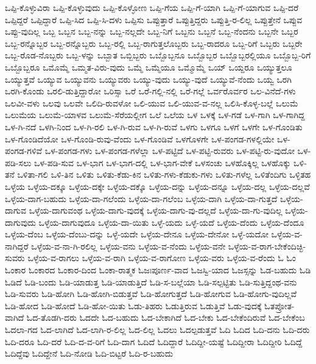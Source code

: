 {ಒಪ್ಪಿ-ಕೊಳ್ಳುವಿರಾ
ಒಪ್ಪಿ-ಕೊಳ್ಳುವುದು
ಒಪ್ಪಿ-ಕೊಳ್ಳೋಣ
ಒಪ್ಪಿ-ಗೆಯ
ಒಪ್ಪಿ-ಗೆ-ಯಾಗಿ
ಒಪ್ಪಿ-ಗೆ-ಯಾಗುವ
ಒಪ್ಪಿ-ದರೆ
ಒಪ್ಪಿದ್ದರೆ
ಒಪ್ಪಿದ್ದಾರೆ
ಒಪ್ಪಿ-ಸಿದ
ಒಪ್ಪಿ-ಸಿ-ದಳು
ಒಪ್ಪಿಸು
ಒಪ್ಪುತ್ತಾರೆ
ಒಪ್ಪುತ್ತಿದ್ದರು
ಒಪ್ಪುತ್ತಿ-ರ-ಲಿಲ್ಲ
ಒಪ್ಪುತ್ತೇನೆ
ಒಪ್ಪುವ
ಒಪ್ಪು-ವುದಿಲ್ಲ
ಒಬ್ಬ
ಒಬ್ಬನ
ಒಬ್ಬ-ನನ್ನು
ಒಬ್ಬ-ನಲ್ಲದೇ
ಒಬ್ಬ-ನಿಗೆ
ಒಬ್ಬನು
ಒಬ್ಬನೆ
ಒಬ್ಬ-ನೆಂದನು
ಒಬ್ಬನೇ
ಒಬ್ಬರ
ಒಬ್ಬ-ರನ್ನೊಬ್ಬರ
ಒಬ್ಬ-ರನ್ನೊಬ್ಬರು
ಒಬ್ಬ-ರಲ್ಲಿ
ಒಬ್ಬ-ರಾಗುತ್ತಲೊಬ್ಬರು
ಒಬ್ಬ-ರಾದರೂ
ಒಬ್ಬ-ರಿಗೆ
ಒಬ್ಬರು
ಒಬ್ಬರೇ
ಒಬ್ಬ-ರೊಡ-ನೊಬ್ಬರು
ಒಬ್ಬ-ಳನ್ನು
ಒಬ್ಬಾತ
ಒಬ್ಬಿಬ್ಬರು
ಒಬ್ಬೊಬ್ಬನೂ
ಒಬ್ಬೊಬ್ಬರ
ಒಬ್ಬೊಬ್ಬರಲ್ಲಿಯೂ
ಒಬ್ಬೊಬ್ಬ-ರಿಗೆ
ಒಬ್ಬೊಬ್ಬರೂ
ಒಮೊಮ್ಮೆ
ಒಮ್ಮತ-ವಿರು-ವುದು
ಒಮ್ಮೆ
ಒಮ್ಮೆಯೂ
ಒಮ್ಮೊಮ್ಮೆ
ಒಯ್
ಒಯ್ದರೂ
ಒಯ್ಯುತ್ತಲೂ
ಒಯ್ಯುತ್ತವೆ
ಒಯ್ಯುವ
ಒಯ್ಯುವನು
ಒಯ್ಯುವರು
ಒಯ್ಯು-ವುದು
ಒಯ್ಯು-ವುದೆ
ಒಯ್ಯುವೆ-ನೆಂದು
ಒಯ್ವ
ಒರಗಿ
ಒರಗಿ-ಕೊಂಡು
ಒರಲಿ-ಡುತ್ತಿದ್ದಾರೋ
ಒರಿಸ್ಸಾ
ಒರೆ
ಒರೆ-ಗಲ್ಲಿ-ನಲ್ಲಿ
ಒರೆ-ಗಲ್ಲೆ
ಒರ್ವರೊರ್ವರ
ಒಲ-ವಿನೆದೆ-ಗಳು
ಒಲವೀ-ವಳು
ಒಲವು
ಒಲವೇ
ಒಲಿದಿ-ರುವಳೋ
ಒಲಿ-ಯುವ
ಒಲಿ-ಯುವ-ವ-ನಲ್ಲ
ಒಲಿಸಿ-ಕೊಳ್ಳ-ಬಲ್ಲೆ
ಒಲುಮೆ
ಒಲುಮೆಯ
ಒಲುಮೆ-ಯಾಳವ
ಒಲುಮೆ-ಸೆರೆಯಲ್ಲೀಗ
ಒಲೆ
ಒಲೆಯ
ಒಳ
ಒಳಕ್ಕೆ
ಒಳ-ಗಡೆ
ಒಳ-ಗಾಗಿ
ಒಳ-ಗಾಗಿದ್ದ
ಒಳ-ಗಿ-ನದೆ
ಒಳಗಿ-ನಿಂದ
ಒಳ-ಗಿ-ರಲಿ
ಒಳ-ಗಿ-ರುವ
ಒಳ-ಗಿ-ರುವೆ
ಒಳಗು
ಒಳಗೂ
ಒಳಗೆ
ಒಳಗೇ
ಒಳ-ಗೊಂಡಿತು
ಒಳ-ಗೊಂಡಿದೆಯೋ
ಒಳ-ಗೊಂಡಿ-ರುವು-ವೆಂದು
ಒಳ-ಗೊಂಡಿವೆ
ಒಳಗೊಳಗೇ
ಒಳ-ಪಂಗಡ-ಗಳಲ್ಲಿಯೇ
ಒಳ-ಪಂಗಡ-ಗಳಿವೆ
ಒಳ-ಪಂಗಡ-ಗಳು
ಒಳ-ಪಂಗಡ-ಗಳೆಲ್ಲಾ
ಒಳ-ಪಟ್ಟಿದೆ
ಒಳ-ಪಟ್ಟಿ-ರುವರು
ಒಳ-ಪಟ್ಟಿ-ರು-ವುದೋ
ಒಳ-ಪಡಿ-ಸಲು
ಒಳ-ಪಡಿ-ಸುವ
ಒಳ-ಭಾಗ
ಒಳ-ಭಾಗ-ದಲ್ಲಿ
ಒಳ-ಭಾಗ-ವೇಕೆ
ಒಳಸಂಚು
ಒಳಹೊಕ್ಕಿಲ್ಲ
ಒಳಹೊಕ್ಕು
ಒಳಿ-ತನೆ
ಒಳಿತಾ-ಗಲಿ
ಒಳಿ-ತಿನ
ಒಳಿತು
ಒಳಿತು-ಕೆಡು-ಕಿನ
ಒಳಿತು-ಗಳು-ಕೆಡುಕು-ಗಳು
ಒಳಿತು-ಗಳೆಲ್ಲ
ಒಳಿತೆಂದಿಗು
ಒಳ್ಳಿತಹ
ಒಳ್ಳೆಯ
ಒಳ್ಳೆಯ-ದಕ್ಕೂ
ಒಳ್ಳೆಯ-ದಕ್ಕೇ
ಒಳ್ಳೆಯ-ದಕ್ಕೊ
ಒಳ್ಳೆಯ-ದನ್ನು
ಒಳ್ಳೆಯ-ದನ್ನೂ
ಒಳ್ಳೆಯ-ದಲ್ಲ
ಒಳ್ಳೆಯ-ದಲ್ಲವೆ
ಒಳ್ಳೆಯ-ದಾಗ-ಬಹುದು
ಒಳ್ಳೆಯ-ದಾ-ಗಲೆಂದು
ಒಳ್ಳೆಯ-ದಾ-ಗಲೆಂಬ
ಒಳ್ಳೆಯ-ದಾಗಿ
ಒಳ್ಳೆಯ-ದಾ-ಗುತ್ತದೆ
ಒಳ್ಳೆಯ-ದಾಗುವ
ಒಳ್ಳೆಯ-ದಾಗುವಂಥ
ಒಳ್ಳೆಯ-ದಾಗು-ವುದಕ್ಕೆ
ಒಳ್ಳೆಯ-ದಾಗು-ವು-ದಲ್ಲದೆ
ಒಳ್ಳೆಯ-ದಾ-ಗು-ವುದಿಲ್ಲ
ಒಳ್ಳೆಯ-ದಾಗುವುದು
ಒಳ್ಳೆಯ-ದಾಗುವುದೂ
ಒಳ್ಳೆಯ-ದಾ-ಯಿತು
ಒಳ್ಳೆ-ಯದು
ಒಳ್ಳೆ-ಯದೆ
ಒಳ್ಳೆಯ-ದೆಂದು
ಒಳ್ಳೆಯ-ದೆಂದೂ
ಒಳ್ಳೆಯ-ದೆಂಬ
ಒಳ್ಳೆಯ-ದೆಂಬು-ದನ್ನು
ಒಳ್ಳೆ-ಯದೇ
ಒಳ್ಳೆಯ-ದೇನೂ
ಒಳ್ಳೆಯ-ದೇನೋ
ಒಳ್ಳೆ-ಯದೋ
ಒಳ್ಳೆಯ-ವ-ನಾಗಿದ್ದರೆ
ಒಳ್ಳೆಯ-ವ-ನಾ-ಗಿ-ರಲಿಲ್ಲ
ಒಳ್ಳೆಯ-ವನು
ಒಳ್ಳೆಯ-ವ-ನೆಂದು
ಒಳ್ಳೆಯ-ವನೇ
ಒಳ್ಳೆಯ-ವ-ರಾಗ-ಬೇಕೆಂದಿಚ್ಛಿ-ಸುವರು
ಒಳ್ಳೆಯ-ವ-ರಾಗಲು
ಒಳ್ಳೆಯ-ವ-ರಾಗಿ
ಒಳ್ಳೆಯ-ವ-ರಾಗೋಣ
ಒಳ್ಳೆಯ-ವರು
ಒಳ್ಳೆಯ-ವ-ರೆಂದು
ಓ
ಓಂ
ಓಂಕಾರ
ಓಂಕಾರದ
ಓಂಕಾರ-ದಿಂದ
ಓಂಕಾ-ರಾತ್ಮಕ
ಓಜಃಪೂರ್ಣ-ವಾದ
ಓಜಸ್ವಿ-ಯಾದ
ಓಜಸ್ಸನ್ನು
ಓಡ-ಬಹುದು
ಓಡಿ
ಓಡಿದೆ
ಓಡಿ-ಬಂದು
ಓಡಿ-ಯಾಡುತ್ತ
ಓಡಿ-ಯಾಡುತ್ತಿದೆ
ಓಡಿ-ಸ-ಬಲ್ಲೆಯಾ
ಓಡಿ-ಸಲ್ಪಟ್ಟಿತು
ಓಡಿ-ಸುತ್ತಿದ್ದಂಥ-ವನು
ಓಡಿ-ಸುವರು
ಓಡಿ-ಹೋಗಿ
ಓಡಿ-ಹೋಗಿ-ಬಿಡುತ್ತವೆ
ಓಡಿ-ಹೋಗುತ್ತದೆ
ಓಡಿ-ಹೋಗುವ
ಓಡಿ-ಹೋಗು-ವುದಿಲ್ಲವೆ
ಓಡಿ-ಹೋದ
ಓಡಿ-ಹೋದೆ
ಓಡಿ-ಹೋ-ಯಿತು
ಓಡು-ತಿಹರು
ಓಡುತ್ತಿರುವ
ಓಡುತ್ತಿವೆ
ಓಡು-ವುದಕ್ಕೆ
ಓತಪ್ರೋತ-ವಾಗಿದೆ
ಓದ-ತೊಡಗಿ-ದರು
ಓದದೇ
ಓದ-ಬಹುದು
ಓದ-ಬೇಕಾಗಿದೆ
ಓದ-ಬೇಕು
ಓದ-ಬೇಕೆಂದಿರುವೆ
ಓದ-ಬೇಕೆಂಬ
ಓದಲಾ-ಗದ
ಓದ-ಲಾಗಿದೆ
ಓದ-ಲಾಗಿ-ರ-ಲಿಲ್ಲ
ಓದ-ಲಿಲ್ಲ
ಓದಲು
ಓದಲ್ಪಡುತ್ತವೆ
ಓದಿ
ಓದಿದ
ಓದಿ-ದನು
ಓದಿ-ದರು
ಓದಿ-ದರೂ
ಓದಿ-ದರೆ
ಓದಿ-ದ-ವ-ರಿಗೆ
ಓದಿ-ದಾಗ
ಓದಿದೆ
ಓದಿದ್ದಾರೆ
ಓದಿದ್ದೀ-ಯಷ್ಟೆ
ಓದಿದ್ದೀರಾ
ಓದಿದ್ದೀರಿ
ಓದಿದ್ದೆ
ಓದಿದ್ದೆವು
ಓದಿದ್ದೇನೆ
ಓದಿ-ನೋಡಿ
ಓದಿ-ಬಿಟ್ಟರೆ
ಓದಿ-ರ-ಬಹುದು
}
